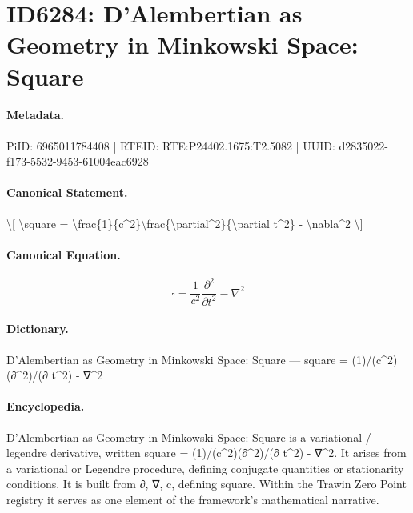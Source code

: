 \section*{ID6284: D’Alembertian as Geometry in Minkowski Space: Square}
\paragraph{Metadata.}
PiID: 6965011784408 | RTEID: RTE:P24402.1675:T2.5082 | UUID: d2835022-f173-5532-9453-61004eac6928

\paragraph{Canonical Statement.}
\textbackslash{}[ \textbackslash{}square = \textbackslash{}frac\{1\}\{c\textasciicircum{}2\}\textbackslash{}frac\{\textbackslash{}partial\textasciicircum{}2\}\{\textbackslash{}partial t\textasciicircum{}2\} - \textbackslash{}nabla\textasciicircum{}2 \textbackslash{}]

\paragraph{Canonical Equation.}
\[
\square = \frac{1}{c^2}\frac{\partial^2}{\partial t^2} - \nabla^2
\]

\paragraph{Dictionary.}
D’Alembertian as Geometry in Minkowski Space: Square — square = (1)/(c\textasciicircum{}2)(∂\textasciicircum{}2)/(∂ t\textasciicircum{}2) - ∇\textasciicircum{}2

\paragraph{Encyclopedia.}
D’Alembertian as Geometry in Minkowski Space: Square is a variational / legendre derivative, written square = (1)/(c\textasciicircum{}2)(∂\textasciicircum{}2)/(∂ t\textasciicircum{}2) - ∇\textasciicircum{}2. It arises from a variational or Legendre procedure, defining conjugate quantities or stationarity conditions. It is built from ∂, ∇, c, defining square. Within the Trawin Zero Point registry it serves as one element of the framework's mathematical narrative.
